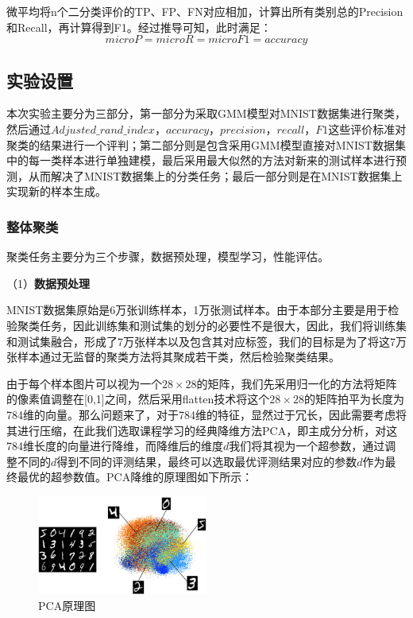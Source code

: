 \documentclass[UTF8]{ctexart}
\begin{document}
微平均将n个二分类评价的TP、FP、FN对应相加，计算出所有类别总的Precision和Recall，再计算得到F1。经过推导可知，此时满足：
\begin{equation}
	microP=microR=microF1=accuracy
\end{equation}

\subsection{实验设置}
本次实验主要分为三部分，第一部分为采取GMM模型对MNIST数据集进行聚类，然后通过$Adjusted\_ rand\_index$，$accuracy$，$precision$，$recall$，$F1$这些评价标准对聚类的结果进行一个评判；第二部分则是包含采用GMM模型直接对MNIST数据集中的每一类样本进行单独建模，最后采用最大似然的方法对新来的测试样本进行预测，从而解决了MNIST数据集上的分类任务；最后一部分则是在MNIST数据集上实现新的样本生成。

\subsubsection{整体聚类}

聚类任务主要分为三个步骤，数据预处理，模型学习，性能评估。

（1）\textbf{数据预处理}

MNIST数据集原始是6万张训练样本，1万张测试样本。由于本部分主要是用于检验聚类任务，因此训练集和测试集的划分的必要性不是很大，因此，我们将训练集和测试集融合，形成了7万张样本以及包含其对应标签，我们的目标是为了将这7万张样本通过无监督的聚类方法将其聚成若干类，然后检验聚类结果。

由于每个样本图片可以视为一个$28 \times 28$的矩阵，我们先采用归一化的方法将矩阵的像素值调整在[0,1]之间，然后采用flatten技术将这个$28 \times 28$的矩阵拍平为长度为784维的向量。那么问题来了，对于784维的特征，显然过于冗长，因此需要考虑将其进行压缩，在此我们选取课程学习的经典降维方法PCA，即主成分分析，对这784维长度的向量进行降维，而降维后的维度$d$我们将其视为一个超参数，通过调整不同的$d$得到不同的评测结果，最终可以选取最优评测结果对应的参数$d$作为最终最优的超参数值。PCA降维的原理图如下所示：

\begin{figure}[!h]
  \includegraphics[width=0.5\textwidth]{./figures/PCA_mnist.png}
  \centering
  \caption{PCA原理图}
  \label{PCA-model}
\end{figure}
\end{document}
